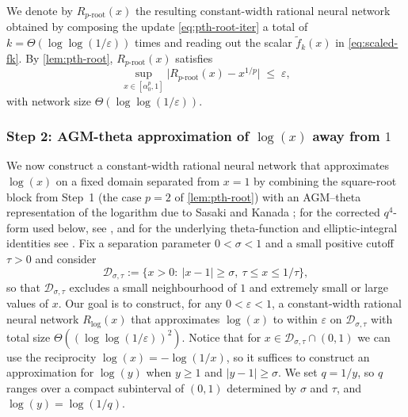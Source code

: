 \documentclass{article}
\theoremstyle{plain}
\theoremstyle{definition}
\theoremstyle{remark}
\begin{document}
We denote by $R_{p\text{-root}}(x)$ the resulting constant-width rational neural network obtained by composing the update \cref{eq:pth-root-iter} a total of $k=\Theta(\log\log(1/\varepsilon))$ times and reading out the scalar $\tilde f_k(x)$ in \cref{eq:scaled-fk}. By \cref{lem:pth-root}, $R_{p\text{-root}}(x)$ satisfies
\[
\sup_{x\in[\alpha_0^p,1]}
\bigl|R_{p\text{-root}}(x)-x^{1/p}\bigr|
\;\le\;\varepsilon,
\]
with network size $\Theta(\log\log(1/\varepsilon))$.


\subsubsection*{Step 2: AGM-theta approximation of $\log(x)$ away from $1$}

We now construct a constant-width rational neural network that approximates $\log(x)$ on a fixed domain separated from $x=1$ by combining the square-root block from Step~1 (the case $p=2$ of \cref{lem:pth-root}) with an AGM--theta representation of the logarithm due to Sasaki and Kanada  {\citep{sasaki1982log}; for the corrected \(q^4\)-form used below, see \citealt[Eq.~(40)]{brent2018borwein}, and for the underlying theta-function and elliptic-integral identities see \citealt[Chs.~2 and 7]{borwein1987piagm}}. Fix a separation parameter $0<\sigma<1$ and a small positive cutoff $\tau>0$ and consider
\[
\mathcal D_{\sigma,\tau}
:=\{x>0:\ |x-1|\ge\sigma,\ \tau\le x\le 1/\tau\},
\]
so that $\mathcal D_{\sigma,\tau}$ excludes a small neighbourhood of $1$ and extremely small or large values of $x$. Our goal is to construct, for any $0<\varepsilon<1$, a constant-width rational neural network $R_{\log}(x)$ that approximates $\log(x)$ to within $\varepsilon$ on $\mathcal D_{\sigma,\tau}$ with total size $\Theta((\log\log(1/\varepsilon))^2)$. Notice that for $x\in\mathcal D_{\sigma,\tau}\cap(0,1)$ we can use the reciprocity \(\log(x)=-\log(1/x)\), so it suffices to construct an approximation for $\log(y)$ when $y\ge 1$ and $|y-1|\ge\sigma$.  {We set \(q=1/y\), so \(q\) ranges over a compact subinterval of \((0,1)\) determined by \(\sigma\) and \(\tau\), and \(\log(y)=\log(1/q)\).}
\end{document}
